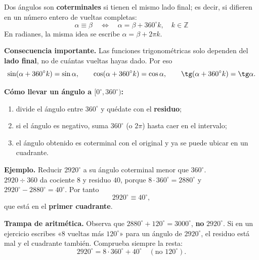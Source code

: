 \documentclass[12pt, letterpaper]{article}
\providecommand{\sen}{\sin}
\begin{document}
Dos ángulos son \textbf{coterminales} si tienen el mismo lado final; es
decir, si difieren en un número entero de vueltas completas:
\[
  \boxed{\;\alpha \equiv \beta \quad\Longleftrightarrow\quad \alpha=\beta+360^\circ k,\quad k\in\mathbb{Z}\;}
\]
En radianes, la misma idea se escribe $\alpha=\beta+2\pi k$.

\begin{cuadroteoria}
  \small
  \textbf{Consecuencia importante.} Las funciones trigonométricas solo
  dependen del \textbf{lado final}, no de cuántas vueltas hayas dado. Por eso
  \[
    \sen(\alpha+360^\circ k)=\sen\alpha,\qquad
    \cos(\alpha+360^\circ k)=\cos\alpha,\qquad
    \tg(\alpha+360^\circ k)=\tg\alpha.
  \]
\end{cuadroteoria}

\begin{cuadropasos}[nobreak]
  \small
  \textbf{Cómo llevar un ángulo a $[0^\circ,360^\circ)$:}
  \begin{enumerate}[leftmargin=1.4em, nosep]
    \item divide el ángulo entre $360^\circ$ y quédate con el \textbf{residuo};
    \item si el ángulo es negativo, suma $360^\circ$ (o $2\pi$) hasta caer en
          el intervalo;
    \item el ángulo obtenido es coterminal con el original y ya se puede
          ubicar en un cuadrante.
  \end{enumerate}
\end{cuadropasos}

\begin{cuadrosolucion}[nobreak]
  \small
  \textbf{Ejemplo.} Reducir $2920^\circ$ a su ángulo coterminal menor que
  $360^\circ$.\\[2pt]
  $2920 \div 360$ da cociente $8$ y residuo $40$, porque
  $8\cdot 360^\circ=2880^\circ$ y $2920^\circ-2880^\circ=40^\circ$. Por tanto
  \[
    2920^\circ \equiv 40^\circ,
  \]
  que está en el \textbf{primer cuadrante}.
\end{cuadrosolucion}

\begin{cuadroadvertencia}
  \small
  \textbf{Trampa de aritmética.} Observa que $2880^\circ+120^\circ=3000^\circ$,
  \textbf{no} $2920^\circ$. Si en un ejercicio escribes «$8$ vueltas más
  $120^\circ$» para un ángulo de $2920^\circ$, el residuo está mal y el
  cuadrante también. Comprueba siempre la resta:
  \[
    2920^\circ=8\cdot 360^\circ+40^\circ \quad(\text{no }120^\circ).
  \]
\end{cuadroadvertencia}
\end{document}

